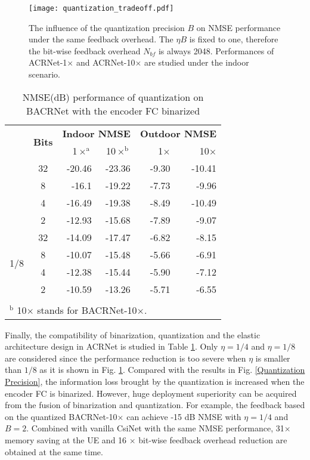 \documentclass[12pt, draftclsnofoot, onecolumn]{IEEEtran}
\begin{document}
\begin{figure}[!t]
\centering
\texttt{[image: quantization\_tradeoff.pdf]}
\caption{The influence of the quantization precision $B$ on NMSE performance under the same feedback overhead. The $\eta B$ is fixed to one, therefore the bit-wise feedback overhead $N_{bf}$ is always 2048. Performances of ACRNet-1$\times$ and ACRNet-10$\times$ are studied under the indoor scenario.}
\label{Quantization Trade Off}
\end{figure}

\begin{table}[!b]
\caption{NMSE(dB) performance of quantization on BACRNet with the encoder FC binarized}
\begin{center}
\makegapedcells \renewcommand\tabcolsep{10pt}
\begin{tabular}{c c | r r | r r}
\Xhline{0.8pt}
\multirow{2}{*}{\textbf{$\bm{\eta}$}} & \multirow{2}{*}{\textbf{Bits}} & \multicolumn{2}{c|}{\textbf{Indoor NMSE}} & \multicolumn{2}{c}{\textbf{Outdoor NMSE}} \\
& & 1$\times^{\mathrm{a}}$ & 10$\times^{\mathrm{b}}$  & 1$\times$ & 10$\times$ \\
\Xhline{0.8pt}
\multirow{4}{*}{1/4}
  & 32 & -20.46 & -23.36 & -9.30 & -10.41 \\
  & 8 & -16.1 & -19.22 & -7.73 & -9.96 \\
  & 4 & -16.49 & -19.38 & -8.49 & -10.49 \\
  & 2 & -12.93 & -15.68 & -7.89 & -9.07 \\
\hline
\multirow{4}{*}{1/8}
  & 32 & -14.09 & -17.47 & -6.82 & -8.15 \\
  & 8 & -10.07 & -15.48 & -5.66 & -6.91 \\
  & 4 & -12.38 & -15.44 & -5.90 & -7.12 \\
  & 2 & -10.59 & -13.26 & -5.71 & -6.55 \\
\Xhline{0.8pt}
\multicolumn{5}{l}{$^{\mathrm{a}}$ 1$\times$ stands for BACRNet-1$\times$.} \\
\multicolumn{5}{l}{$^{\mathrm{b}}$ 10$\times$ stands for BACRNet-10$\times$.} \\
\end{tabular}
\label{table-quantization-binarization}
\end{center}
\end{table}

Finally, the compatibility of binarization, quantization and the elastic architecture design in ACRNet is studied in Table \ref{table-quantization-binarization}. Only $\eta=1/4$ and $\eta=1/8$ are considered since the performance reduction is too severe when $\eta$ is smaller than $1/8$ as it is shown in Fig. \ref{Quantization Trade Off}. Compared with the results in Fig. \ref{Quantization Precision}, the information loss brought by the quantization is increased when the encoder FC is binarized. However, huge deployment superiority can be acquired from the fusion of binarization and quantization. For example, the feedback based on the quantized BACRNet-10$\times$ can achieve -15 dB NMSE with $\eta=1/4$ and $B=2$. Combined with vanilla CsiNet with the same NMSE performance, 31$\times$ memory saving at the UE and 16 $\times$ bit-wise feedback overhead reduction are obtained at the same time.
\end{document}
